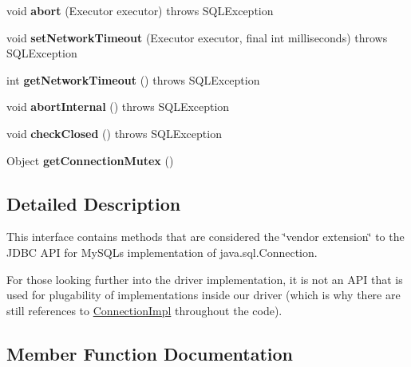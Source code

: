 \begin{DoxyCompactItemize}
void {\bfseries abort} (Executor executor)  throws S\+Q\+L\+Exception
\item 
\mbox{\label{interfacecom_1_1mysql_1_1jdbc_1_1_connection_ab46d69f2e7c0da9ca87e07cd12abdd3e}} 
void {\bfseries set\+Network\+Timeout} (Executor executor, final int milliseconds)  throws S\+Q\+L\+Exception
\item 
\mbox{\label{interfacecom_1_1mysql_1_1jdbc_1_1_connection_aee11cbaeebd30c4fa4e16659e52e07ed}} 
int {\bfseries get\+Network\+Timeout} ()  throws S\+Q\+L\+Exception
\item 
\mbox{\label{interfacecom_1_1mysql_1_1jdbc_1_1_connection_a6e34c9d5b2963fcaefbbc98b1eaeb936}} 
void {\bfseries abort\+Internal} ()  throws S\+Q\+L\+Exception
\item 
\mbox{\label{interfacecom_1_1mysql_1_1jdbc_1_1_connection_a8feb1eb6fcc9edaac4b2f69bf480bd4d}} 
void {\bfseries check\+Closed} ()  throws S\+Q\+L\+Exception
\item 
\mbox{\label{interfacecom_1_1mysql_1_1jdbc_1_1_connection_a34de3e9bdac4882c17ce5672e6ccfc76}} 
Object {\bfseries get\+Connection\+Mutex} ()
\end{DoxyCompactItemize}


\subsection{Detailed Description}
This interface contains methods that are considered the \char`\"{}vendor extension\char`\"{} to the J\+D\+BC A\+PI for My\+S\+QL\textquotesingle{}s implementation of java.\+sql.\+Connection.

For those looking further into the driver implementation, it is not an A\+PI that is used for plugability of implementations inside our driver (which is why there are still references to \mbox{\hyperlink{classcom_1_1mysql_1_1jdbc_1_1_connection_impl}{Connection\+Impl}} throughout the code). 

\subsection{Member Function Documentation}
\mbox{\label{interfacecom_1_1mysql_1_1jdbc_1_1_connection_a6a6160ecb2c19b5f246450ba9252907d}} 
